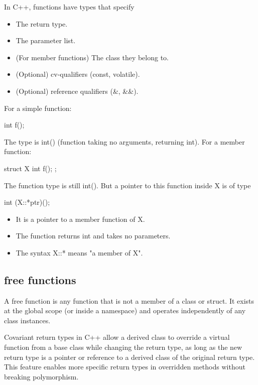\documentclass{report}
\begin{document}
\pagebreak 
{}
\bigbreak \noindent 
In C++, functions have types that specify
\begin{itemize}
    \item The return type.
    \item The parameter list.
    \item (For member functions) The class they belong to.
    \item (Optional) cv-qualifiers (const, volatile).
    \item (Optional) reference qualifiers (\&, \&\&).
\end{itemize}
\bigbreak \noindent 
For a simple function:
\bigbreak \noindent 
\begin{cppcode}
int f();
\end{cppcode}
\bigbreak \noindent 
The type is int() (function taking no arguments, returning int).
\bigbreak \noindent 
For a member function:
\bigbreak \noindent 
\begin{cppcode}
struct X {
    int f();
};
\end{cppcode}
\bigbreak \noindent 
The function type is still int(). But a pointer to this function inside X is of type
\bigbreak \noindent 
\begin{cppcode}
int (X::*ptr)();
\end{cppcode}
\begin{itemize}
    \item It is a pointer to a member function of X.
    \item The function returns int and takes no parameters.
    \item The syntax X::* means "a member of X".
\end{itemize}
\bigbreak \noindent 
\subsection{free functions}
\bigbreak \noindent 
A free function is any function that is not a member of a class or struct. It exists at the global scope (or inside a namespace) and operates independently of any class instances.

\pagebreak 
{}
\bigbreak \noindent 
Covariant return types in C++ allow a derived class to override a virtual function from a base class while changing the return type, as long as the new return type is a pointer or reference to a derived class of the original return type. This feature enables more specific return types in overridden methods without breaking polymorphism.
\end{document}
